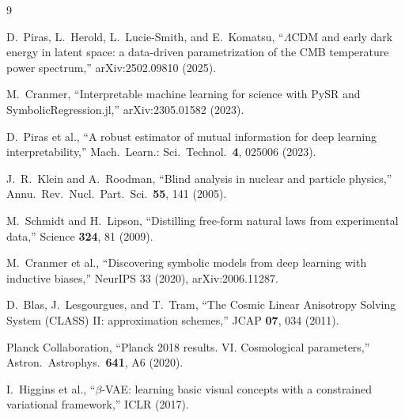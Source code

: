 \documentclass[twocolumn,10pt]{article}
\begin{document}
\begingroup
\footnotesize
\begin{thebibliography}{9}
\setlength{\itemsep}{1pt}

D.~Piras, L.~Herold, L.~Lucie-Smith, and E.~Komatsu,
``$\Lambda$CDM and early dark energy in latent space: a data-driven
parametrization of the CMB temperature power spectrum,''
arXiv:2502.09810 (2025).

M.~Cranmer,
``Interpretable machine learning for science with PySR and
SymbolicRegression.jl,''
arXiv:2305.01582 (2023).

D.~Piras et al.,
``A robust estimator of mutual information for deep learning
interpretability,''
Mach.\ Learn.: Sci.\ Technol.\ \textbf{4}, 025006 (2023).

J.~R.~Klein and A.~Roodman,
``Blind analysis in nuclear and particle physics,''
Annu.\ Rev.\ Nucl.\ Part.\ Sci.\ \textbf{55}, 141 (2005).

M.~Schmidt and H.~Lipson,
``Distilling free-form natural laws from experimental data,''
Science \textbf{324}, 81 (2009).

M.~Cranmer et al.,
``Discovering symbolic models from deep learning with inductive biases,''
NeurIPS 33 (2020), arXiv:2006.11287.

D.~Blas, J.~Lesgourgues, and T.~Tram,
``The Cosmic Linear Anisotropy Solving System (CLASS) II: approximation
schemes,''
JCAP \textbf{07}, 034 (2011).

Planck Collaboration,
``Planck 2018 results. VI. Cosmological parameters,''
Astron.\ Astrophys.\ \textbf{641}, A6 (2020).

I.~Higgins et al.,
``$\beta$-VAE: learning basic visual concepts with a constrained variational
framework,''
ICLR (2017).

\end{thebibliography}
\endgroup
\end{document}
